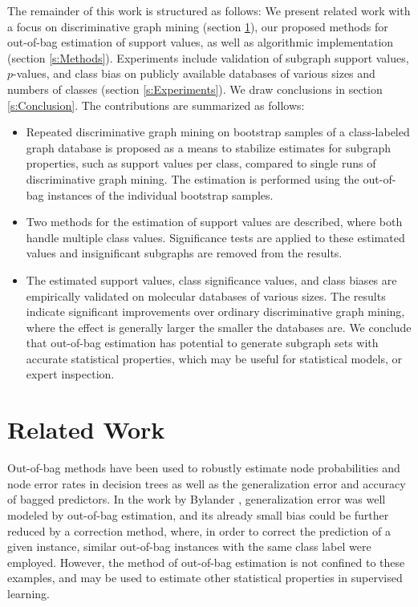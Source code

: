 \documentclass{sig-alternate}
\begin{document}
The remainder of this work is structured as follows: We present related work
with a focus on discriminative graph mining (section \ref{s:relatedWork}), our
proposed methods for out-of-bag estimation of support values, as
well as algorithmic implementation (section \ref{s:Methods}).
Experiments include validation of subgraph support
values, $p$-values, and class bias on publicly available databases of
various sizes and numbers of classes (section \ref{s:Experiments}).
We draw conclusions in section \ref{s:Conclusion}.
The contributions are summarized as follows:
\begin{itemize}
  \item Repeated discriminative graph mining on bootstrap samples of a
    class-labeled graph database is proposed as a means to stabilize estimates
    for subgraph properties, such as support values per class, compared to
    single runs of discriminative graph mining. The estimation is performed
    using the out-of-bag instances of the individual bootstrap samples.
  \item Two methods for the estimation of support values are described, where both
    handle multiple class values. Significance tests are applied to these
    estimated values and insignificant subgraphs are removed from the results. 
  \item The estimated support values, class significance values, and class
    biases are empirically validated on molecular databases of various
    sizes. The results indicate significant improvements over 
    ordinary discriminative graph mining, where the effect is generally larger the
    smaller the databases are. We conclude that out-of-bag estimation has 
    potential to generate subgraph sets with accurate statistical properties,
    which may be useful for statistical models, or expert inspection.
\end{itemize}


\section{Related Work}
\label{s:relatedWork}

Out-of-bag methods have been used to robustly estimate node probabilities and
node error rates in decision trees \cite{breiman96oob} as well as the
generalization error and accuracy of bagged predictors. In the work by Bylander
\cite{bylander02estimating}, generalization error was well modeled by
out-of-bag estimation, and its already small bias could be further reduced by a
correction method, where, in order to correct the prediction of a given
instance, similar out-of-bag instances with the same class label were
employed. However, the method of out-of-bag estimation is not confined to these
examples, and may be used to estimate other statistical properties in
supervised learning.
\end{document}
